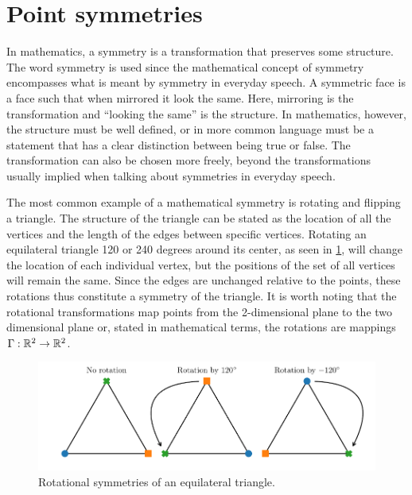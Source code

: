 \section{Point symmetries}

In mathematics, a symmetry is a transformation that preserves some structure.
The word symmetry is used since the mathematical concept of symmetry encompasses what is meant by symmetry in everyday speech.
A symmetric face is a face such that when mirrored it look the same.
Here, mirroring is the transformation and \enquote{looking the same} is the structure.
In mathematics, however, the structure must be well defined, or in more common language must be a statement that has a clear distinction between being true or false.
The transformation can also be chosen more freely, beyond the transformations usually implied when talking about symmetries in everyday speech.

The most common example of a mathematical symmetry is rotating and flipping a triangle.
The structure of the triangle can be stated as the location of all the vertices and the length of the edges between specific vertices.
Rotating an equilateral triangle 120 or 240 degrees around its center, as seen in \cref{fig:triangle-rotation}, will change the location of each individual vertex, but the positions of the set of all vertices will remain the same.
Since the edges are unchanged relative to the points, these rotations thus constitute a symmetry of the triangle.
It is worth noting that the rotational transformations map points from the 2-dimensional plane to the two dimensional plane or, stated in mathematical terms, the rotations are mappings \(\Gamma: \mathbb{R}^2 \to \mathbb{R}^2\).
\begin{figure}
  \centering
  \includegraphics[width=.96\textwidth]{images/triangles}
  \caption{Rotational symmetries of an equilateral triangle.}
  \label{fig:triangle-rotation}
\end{figure}

